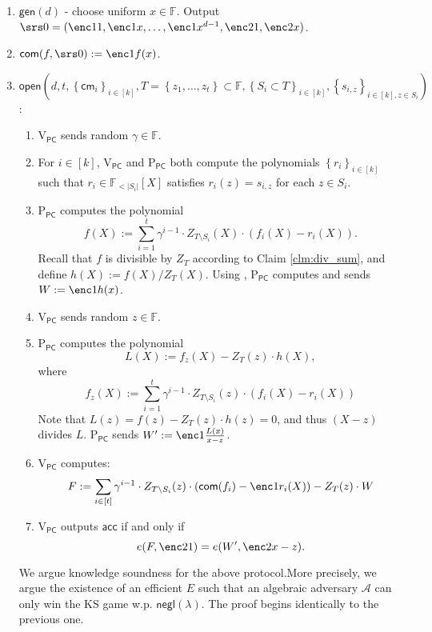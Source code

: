\documentclass[11pt]{article} %
\newcommand{\F}{\ensuremath{\mathbb F}\xspace}
\newcommand{\adv}{\ensuremath{\mathcal A}\xspace}
\newcommand{\com}{\ensuremath{\mathsf{com}}\xspace}
\newcommand{\cm}{\ensuremath{\mathsf{cm}}\xspace}
\newcommand{\open}{\ensuremath{\mathsf{open}}\xspace}
\newcommand{\negl}{\ensuremath{\mathsf{negl}(\lambda)}\xspace}
\newcommand{\acc}{\ensuremath{\mathsf{acc}}\xspace}
\newcommand{\defeq}{:=}
\newcommand{\sett}[2]{\ensuremath{\set{#1}_{#2}}\xspace}
\newcommand{\gen}{\ensuremath{\mathsf{gen}}\xspace}
\newcommand{\prvpc}{\ensuremath{\mathrm{P_{\mathsf{PC}}}}\xspace}
\newcommand{\verpc}{\ensuremath{\mathrm{V_{\mathsf{PC}}}}\xspace}
\newcommand{\ext}{\ensuremath{E}\xspace}
\newcommand{\set}[1]{\ensuremath{\left\{#1\right\}}\xspace}
\newcommand{\polysofdeg}[1]{\ensuremath{\F_{< #1}[X]}\xspace}
\begin{document}
\begin{enumerate}
 \item $\gen(d)$ - choose uniform $x\in \F$. Output $\srs0 =(\enc1{1},\enc1{x},\ldots,\enc1{x^{d-1}},\enc2{1},\enc2{x})$.
 \item $\com(f,\srs0) \defeq \enc1{f(x)}$.
 \item  
 \noindent
 $\open\left(d,t,\sett{\cm_i}{i\in [k]},T=\set{z_1,\ldots,z_t}\subset \F,\sett{S_i\subset T}{i\in [k]},\sett{s_{i,z}}{i\in [k],z\in S_i}\right)$:
 \begin{enumerate}
  \item \verpc sends random $\gamma\in \F$.
  \item For $i\in [k]$, \verpc and \prvpc both compute the polynomials \sett{r_i}{i\in [k]}
  such that $r_i\in \polysofdeg{|S_i|}$ satisfies $r_i(z) = s_{i,z}$ for each $z\in S_i$. 
 \item \prvpc computes the polynomial
 \[f(X)\defeq \sum_{i=1}^t \gamma^{i-1}\cdot Z_{T\setminus S_i}(X)\cdot (f_i(X)-r_i(X)).\]
 Recall that $f$ is divisible by $Z_T$ according to Claim \ref{clm:div_sum}, and define
 $h(X)\defeq f(X)/Z_T(X)$.
 Using , \prvpc computes and sends $W\defeq \enc1{h(x)}$.
 \item \verpc sends random $z\in \F$.
%  

\item \prvpc computes the polynomial
\[L(X)\defeq f_z(X) - Z_T(z)\cdot h(X),\]
where 
\[f_z(X)\defeq \sum_{i=1}^t \gamma^{i-1}\cdot Z_{T\setminus S_i}(z)\cdot (f_i(X)-r_i(X))\]
Note that $L(z)= f(z)- Z_T(z)\cdot h(z) =0$, and thus $(X-z)$ divides $L$.
\prvpc sends $W'\defeq \enc1{\frac{L(x)}{x-z}}$.

\item \verpc computes:
\[F\defeq \sum_{i\in [t]} \gamma^{i-1} \cdot Z_{T\setminus S_i}(z)\cdot (\com(f_i) - \enc1{r_i(X)}) - Z_T(z)\cdot W \]
 \item \verpc outputs \acc if and only if
 \[ e(F,\enc2{1}) = e(W',\enc2{x-z}).\]

\end{enumerate}

 We argue knowledge soundness for the above protocol.More precisely, we argue the existence of an efficient \ext such that an algebraic adversary \adv can only win the KS game w.p. \negl.  The proof begins identically to the previous one. 
 

\end{enumerate}
\end{document}
